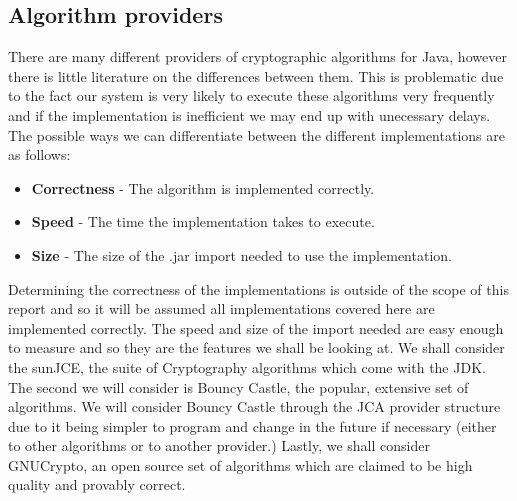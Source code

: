 \documentclass[12pt, titlepage]{article}
\begin{document}
\subsection{Algorithm providers}
There are many different providers of cryptographic algorithms for Java, however there is little literature on the differences between them. This is problematic due to the fact our system is very likely to execute these algorithms very frequently and if the implementation is inefficient we may end up with unecessary delays. The possible ways we can differentiate between the different implementations are as follows:
\begin{itemize}
	\item \textbf{Correctness} - The algorithm is implemented correctly.
	\item \textbf{Speed} - The time the implementation takes to execute.
	\item \textbf{Size} - The size of the .jar import needed to use the implementation.
\end{itemize}
Determining the correctness of the implementations is outside of the scope of this report and so it will be assumed all implementations covered here are implemented correctly. The speed and size of the import needed are easy enough to measure and so they are the features we shall be looking at.
\newline \indent We shall consider the sunJCE, the suite of Cryptography algorithms which come with the JDK. The second we will consider is Bouncy Castle, the popular, extensive set of algorithms. We will consider Bouncy Castle through the JCA provider structure due to it being simpler to program and change in the future if necessary (either to other algorithms or to another provider.) Lastly, we shall consider GNUCrypto, an open source set of algorithms which are claimed to be high quality and provably correct.
\end{document}
